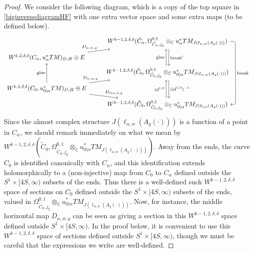 \documentclass[12pt]{article}
\theoremstyle{definition}
\theoremstyle{remark}
\numberwithin{equation}{subsection}
\newcommand{\CC}{\mathbb C}
\newcommand{\id}{\operatorname{id}}
\begin{document}
\begin{proof}
We consider the following diagram, which is a copy of the top square in \eqref{biginversediagramHF} with one extra vector space and some extra maps (to be defined below).
\begin{equation}\label{topdiagrambigger}
\begin{tikzcd}[row sep = tiny]
{}&W^{k-1,2,\delta,\delta}(\tilde C_\alpha,\Omega^{0,1}_{\tilde C_\alpha,j_y}\otimes_\CC u_\alpha^\ast TM_{J(\ell_{\alpha,w}(A_y(\cdot)))})\ar[shift left=0.5ex]{dd}{\mathrm{break}'}\ar[rounded corners,to path={(\tikztostart) -- ([xshift=2ex]\tikztostart.east) -- ([xshift=2ex]\tikztotarget.east) \tikztonodes -- (\tikztotarget)}]{dddd}{\mathrm{break}}\\
W^{k,2,\delta,\delta}(C_\alpha,u_\alpha^\ast TM)_{D,H}\oplus E\ar{ru}{D_{\alpha,w,y}}\\
{}&W^{k-1,2,\delta,\delta}(\tilde C_0,\Omega^{0,1}_{\tilde C_0,j_y}\otimes_\CC u_{0|\alpha}^\ast TM_{J(\ell_{\alpha,w}(A_y(\cdot)))})\ar[shift right=-0.5ex]{uu}{\mathrm{glue}}\ar[shift left=0.5ex]{dd}{(\id^{1,0})^{-1}}\\
W^{k,2,\delta,\delta}(C_0,u_{0|\alpha}^\ast TM)_{D,H}\oplus E\ar{uu}{\mathrm{glue}}\ar{rd}{D_{0|\alpha,0,y}}\ar{ru}{D_{\alpha,w,y}}\\
{}&W^{k-1,2,\delta,\delta}(\tilde C_0,\Omega^{0,1}_{\tilde C_0,j_y}\otimes_\CC u_{0|\alpha}^\ast TM_{J(\ell_{0,0}(A_y(\cdot)))})\ar[shift right=-0.5ex]{uu}{\id^{1,0}}
\end{tikzcd}
\end{equation}
Since the almost complex structure $J(\ell_{\alpha,w}(A_y(\cdot)))$ is a function of a point in $C_\alpha$, we should remark immediately on what we mean by $W^{k-1,2,\delta,\delta}(\tilde C_0,\Omega^{0,1}_{\tilde C_0,j_y}\otimes_\CC u_{0|\alpha}^\ast TM_{J(\ell_{\alpha,w}(A_y(\cdot)))})$.  Away from the ends, the curve $C_0$ is identified canonically with $C_\alpha$, and this identification extends holomorphically to a (non-injective) map from $C_0$ to $C_\alpha$ defined outside the $S^1\times[4S,\infty)$ subsets of the ends.  Thus there is a well-defined such $W^{k-1,2,\delta,\delta}$ space of sections on $C_0$ defined outside the $S^1\times[4S,\infty)$ subsets of the ends, valued in $\Omega^{0,1}_{\tilde C_0,j_y}\otimes_\CC u_{0|\alpha}^\ast TM_{J(\ell_{\alpha,w}(A_y(\cdot)))}$.  Now, for instance, the middle horizontal map $D_{\alpha,w,y}$ can be seen as giving a section in this $W^{k-1,2,\delta,\delta}$ space defined outside $S^1\times[4S,\infty)$.  In the proof below, it is convenient to use this $W^{k-1,2,\delta,\delta}$ space of sections defined outside $S^1\times[4S,\infty)$, though we must be careful that the expressions we write are well-defined.


\end{proof}
\end{document}
